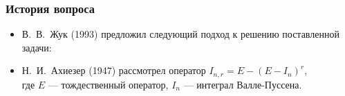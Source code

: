 \documentclass[pdf, 9pt, unicode]{beamer} %
\begin{document}
\begin{frame}
\frametitle{История вопроса}
\Large{
\begin{itemize}
\item 
В.~В.~Жук (1993)  предложил следующий подход к решению поставленной задачи:



\item
Н.~И.~Ахиезер (1947) 
рассмотрел оператор $I_{n,r} = E - (E-I_n)^r$,\\ где $E$ --- тождественный оператор, $I_n$ --- интеграл Валле-Пуссена.



\end{itemize}
}
\end{frame}
\end{document}
